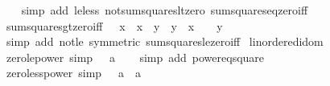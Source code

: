 \begin{isabellebody}
%
\isadelimproof
\ \ %
\endisadelimproof
%
\isatagproof
{}\isamarkupfalse%
\ {\isacharparenleft}{\kern0pt}simp\ add{\isacharcolon}{\kern0pt}\ le{\isacharunderscore}{\kern0pt}less\ not{\isacharunderscore}{\kern0pt}sum{\isacharunderscore}{\kern0pt}squares{\isacharunderscore}{\kern0pt}lt{\isacharunderscore}{\kern0pt}zero\ sum{\isacharunderscore}{\kern0pt}squares{\isacharunderscore}{\kern0pt}eq{\isacharunderscore}{\kern0pt}zero{\isacharunderscore}{\kern0pt}iff{\isacharparenright}{\kern0pt}%
\endisatagproof
{\isafoldproof}%
%
\isadelimproof
\isanewline
%
\endisadelimproof
\isanewline
{}\isamarkupfalse%
\ sum{\isacharunderscore}{\kern0pt}squares{\isacharunderscore}{\kern0pt}gt{\isacharunderscore}{\kern0pt}zero{\isacharunderscore}{\kern0pt}iff{\isacharcolon}{\kern0pt}\ {\isachardoublequoteopen}{}\ {\isacharless}{\kern0pt}\ x\ {\isacharasterisk}{\kern0pt}\ x\ {\isacharplus}{\kern0pt}\ y\ {\isacharasterisk}{\kern0pt}\ y\ {\isasymlongleftrightarrow}\ x\ {\isasymnoteq}\ {}\ {\isasymor}\ y\ {\isasymnoteq}\ {}{\isachardoublequoteclose}\isanewline
%
\isadelimproof
\ \ %
\endisadelimproof
%
\isatagproof
{}\isamarkupfalse%
\ {\isacharparenleft}{\kern0pt}simp\ add{\isacharcolon}{\kern0pt}\ not{\isacharunderscore}{\kern0pt}le\ {\isacharbrackleft}{\kern0pt}symmetric{\isacharbrackright}{\kern0pt}\ sum{\isacharunderscore}{\kern0pt}squares{\isacharunderscore}{\kern0pt}le{\isacharunderscore}{\kern0pt}zero{\isacharunderscore}{\kern0pt}iff{\isacharparenright}{\kern0pt}%
\endisatagproof
{\isafoldproof}%
%
\isadelimproof
\isanewline
%
\endisadelimproof
\isanewline
{}\isamarkupfalse%
\isanewline
\isanewline
{}\isamarkupfalse%
\ linordered{\isacharunderscore}{\kern0pt}idom\isanewline
{}\isanewline
\isanewline
{}\isamarkupfalse%
\ zero{\isacharunderscore}{\kern0pt}le{\isacharunderscore}{\kern0pt}power{}\ {\isacharbrackleft}{\kern0pt}simp{\isacharbrackright}{\kern0pt}{\isacharcolon}{\kern0pt}\ {\isachardoublequoteopen}{}\ {\isasymle}\ a\isanewline
%
\isadelimproof
\ \ %
\endisadelimproof
%
\isatagproof
{}\isamarkupfalse%
\ {\isacharparenleft}{\kern0pt}simp\ add{\isacharcolon}{\kern0pt}\ power{}{\isacharunderscore}{\kern0pt}eq{\isacharunderscore}{\kern0pt}square{\isacharparenright}{\kern0pt}%
\endisatagproof
{\isafoldproof}%
%
\isadelimproof
\isanewline
%
\endisadelimproof
\isanewline
{}\isamarkupfalse%
\ zero{\isacharunderscore}{\kern0pt}less{\isacharunderscore}{\kern0pt}power{}\ {\isacharbrackleft}{\kern0pt}simp{\isacharbrackright}{\kern0pt}{\isacharcolon}{\kern0pt}\ {\isachardoublequoteopen}{}\ {\isacharless}{\kern0pt}\ a\ {\isasymlongleftrightarrow}\ a\ {\isasymnoteq}\ {}{\isachardoublequoteclose}\isanewline

\end{isabellebody}
